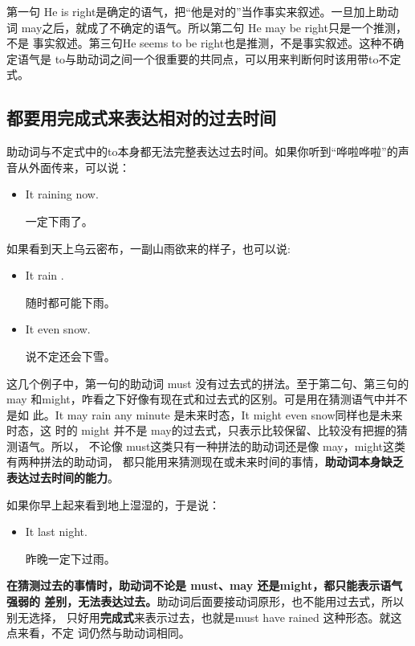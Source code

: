 第一句 He is right是确定的语气，把“他是对的”当作事实来叙述。一旦加上助动
词 may之后，就成了不确定的语气。所以第二句 He may be right只是一个推测，不是
事实叙述。第三句He seems to be right也是推测，不是事实叙述。这种不确定语气是
to与助动词之间一个很重要的共同点，可以用来判断何时该用带to不定式。

\subsection{都要用完成式来表达相对的过去时间}

助动词与不定式中的to本身都无法完整表达过去时间。如果你听到“哗啦哗啦”的声音从外面传来，可以说：
\begin{itemize}
\item It  raining now.

  一定下雨了。
\end{itemize}

如果看到天上乌云密布，一副山雨欲来的样子，也可以说:
\begin{itemize}
\item It  rain .

  随时都可能下雨。
\item It  even snow.

  说不定还会下雪。
\end{itemize}

这几个例子中，第一句的助动词 must 没有过去式的拼法。至于第二句、第三句的may
和might，咋看之下好像有现在式和过去式的区别。可是用在猜测语气中并不是如
此。It may rain any minute 是未来时态，It might even snow同样也是未来时态，这
时的 might 并不是 may的过去式，只表示比较保留、比较没有把握的猜测语气。所以，
不论像 must这类只有一种拼法的助动词还是像 may，might这类有两种拼法的助动词，
都只能用来猜测现在或未来时间的事情，\textbf{助动词本身缺乏表达过去时间的能力}。

如果你早上起来看到地上湿湿的，于是说：

\begin{itemize}
\item  It  last night.

  昨晚一定下过雨。
\end{itemize}

\textbf{在猜测过去的事情时，助动词不论是 must、may 还是might，都只能表示语气强弱的
  差别，无法表达过去。}助动词后面要接动词原形，也不能用过去式，所以别无选择，
只好用\textbf{完成式}来表示过去，也就是must have rained 这种形态。就这点来看，不定
词仍然与助动词相同。

